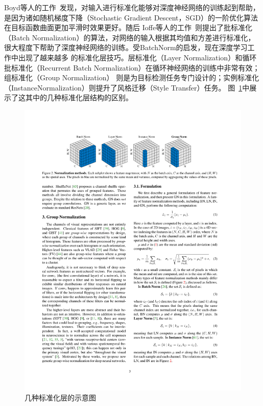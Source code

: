 Boyd等人的工作~\citep{boyd_convex_2004}发现，对输入进行标准化能够对深度神经网络的训练起到帮助，是因为诸如随机梯度下降（Stochastic Gradient Descent，SGD）的一阶优化算法在目标函数曲面更加平滑时效果更好。随后
Ioffe等人的工作~\citep{ioffe2015BN}则提出了批标准化（Batch Normalization）的算法，对网络的输入根据其均值和方差进行标准化，很大程度下帮助了深度神经网络的训练。受BatchNorm的启发，现在深度学习工作中出现了越来越多
的标准化层技巧。层标准化（Layer Normalization）\citep{lei2016LayerNorm}和循环批标准化（Recurrent Batch Normalization）\citep{cooijmans2016recurrent}在循环神经网络的训练中非常有效；组标准化（Group Normalization）
\citep{wu2018GroupNorm}则是为目标检测任务专门设计的；实例标准化（InstanceNormalization）\citep{ulyanov_instance_2016}则提升了风格迁移（Style Transfer）任务。
图~\ref{fig:norm}中展示了这其中的几种标准化层结构的区别。
\begin{figure}
    \centering
    \includegraphics[width=\linewidth]{figures/norm.pdf}
    \caption{几种标准化层的示意图~\citep{wu2018GroupNorm}}
    \label{fig:norm}
\end{figure}

